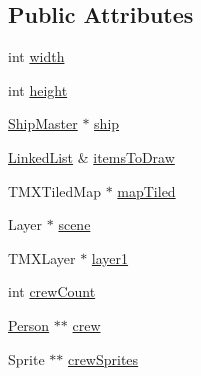 \subsection*{Public Attributes}
\begin{DoxyCompactItemize}
\item 
int \hyperlink{classMapVisualizer_a6e43275dd163342cea857a167c030279}{width}
\item 
int \hyperlink{classMapVisualizer_a8188730e44205bff9042b5188a8da27f}{height}
\item 
\hyperlink{classShipMaster}{Ship\-Master} $\ast$ \hyperlink{classMapVisualizer_aae41754a661628c88a957589e48b7b9e}{ship}
\item 
\hyperlink{classLinkedList}{Linked\-List} \& \hyperlink{classMapVisualizer_a73722302b4056efd5a43d633c8590b21}{items\-To\-Draw}
\item 
T\-M\-X\-Tiled\-Map $\ast$ \hyperlink{classMapVisualizer_a8178bb6206e1d4f7eded58480e43d92c}{map\-Tiled}
\item 
Layer $\ast$ \hyperlink{classMapVisualizer_a7fde95f09d1c8ef52b79e6d65d7c0b0c}{scene}
\item 
T\-M\-X\-Layer $\ast$ \hyperlink{classMapVisualizer_acb9dfe2f29396a1938df1303612b6704}{layer1}
\item 
int \hyperlink{classMapVisualizer_aee1be87aff3988b22df7af13202f3aeb}{crew\-Count}
\item 
\hyperlink{classPerson}{Person} $\ast$$\ast$ \hyperlink{classMapVisualizer_a918c6dda3581d5541f4106bfdb16e7f6}{crew}
\item 
Sprite $\ast$$\ast$ \hyperlink{classMapVisualizer_a888b3918b38bb1f9cbbf9e28478de1bb}{crew\-Sprites}
\end{DoxyCompactItemize}


